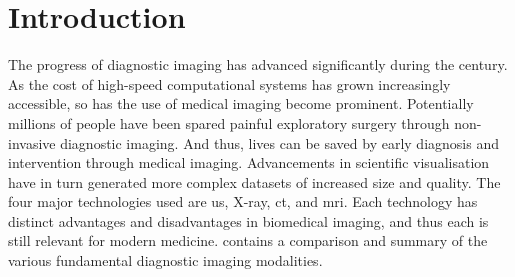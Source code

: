 \chapter{Introduction} \label{cha:introduction} %
The progress of diagnostic imaging has advanced significantly during the  century. As the cost of high-speed computational systems has grown increasingly accessible, so has the use of medical imaging become prominent. Potentially millions of people have been spared painful exploratory surgery through non-invasive diagnostic imaging. And thus, lives can be saved by early diagnosis and intervention through medical imaging. Advancements in scientific visualisation have in turn generated more complex datasets of increased size and quality. The four major technologies used are \gls{us}, X-ray, \gls{ct}, and \gls{mri}. Each technology has distinct advantages and disadvantages in biomedical imaging, and thus each is still relevant for modern medicine.  contains a comparison and summary of the various fundamental diagnostic imaging modalities.


